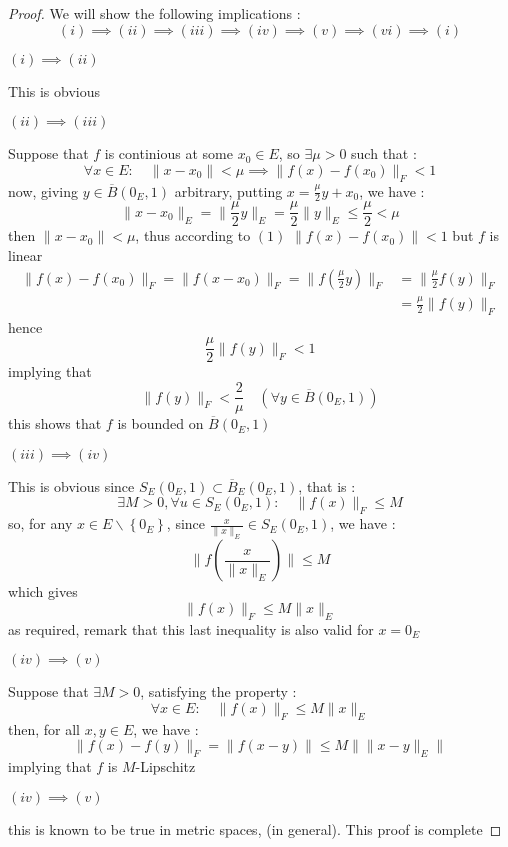 \begin{proof}
	We will show the following implications : 
	\[
		(i)  \implies 
		(ii)  \implies 
		(iii)  \implies 
		(iv)  \implies 
		(v)  \implies 
		(vi)  \implies 
		(i) 
	\]
	\divider 
	\begin{center}
		$(i) \implies (ii)  $ 
	\end{center}
	This is obvious 
	\divider 
	\begin{center}
		$(ii) \implies (iii)  $ 
	\end{center}
	Suppose that $f$ is continious 
	at some $x_0 \in E$, so $\exists \mu > 0$ such that : 
	\begin{equation}
		\forall x \in E : 
		\quad \| x-x_0 \|  < \mu \implies 
		\| f(x)  - f(x_0)  \|  _{F} < 1
	\end{equation}
	now, giving $y \in  \overline{B} \left( 0_{E},1 \right)$ arbitrary, 
	putting $x = \frac{\mu}{2}y + x_0$, we have : 
	\[
	\| x-x_0 \| _{E} = 
	\| \frac{\mu}{2}y \| _{E} = 
	\frac{\mu}{2} \| y \| _{E} \leq  \frac{\mu}{2} < \mu
	\]
	then $\| x-x_0 \| < \mu$, thus according to $(1)$ 
	$\| f(x) - f(x_0)  \| <  1$ but $f$ is linear 
	\begin{align*}
	\| f(x) - f(x_0)  \|_{F} = 
	\| f(x-x_0)  \| _{F} = 
	\| f \left( \frac{\mu}{2} y \right) \| _{F} &=
	 \| \frac{\mu}{2} f \left( y \right) \| _{F} \\
						    &= \frac{\mu}{2}
						    \| f \left( y \right) \| _{F}
	\end{align*}
	hence 
	\[
	\frac{\mu}{2} \| f(y)  \| _{F} < 1
	\]
	implying that 
	\[
	\| f(y)  \| _{F} < \frac{2}{\mu} \quad 
	\left( \forall  y \in \overline{B}\left( 0_{E},1 \right) \right)
	\]
	this shows that $f$ is bounded on $\overline{B}(0_{E},1) $ 
	\divider 
	\begin{center}
		$(iii) \implies (iv)  $ 
	\end{center}
	This is obvious since $S_{E} \left( 0_{E},1 \right) \subset 
	\overline{B}_{E} \left( 0_{E},1 \right)$, that is : 
	\[
	\exists M > 0, \forall u \in S_{E} \left( 0_{E},1 \right) : 
	\quad \| f(x)  \| _{F} \leq M
	\]
	so, for any $x \in  E \backslash \left\{ 0_{E} \right\}$, since
	$\frac{x}{\| x \|_{E} } \in S_{E} \left( 0_{E},1 \right)$, we have :
	\[
		\| f \left( \frac{x}{\| x \| _{E}} \right) \|  \leq 
		M 
	\]
	which gives 
	\[
	\| f(x)  \| _{F} \leq M \| x \| _{E}
	\]
	as required, remark that this last inequality is also valid for 
	$x= 0_{E}$ 
	\divider 
	\begin{center}
		$(iv) \implies (v)  $ 
	\end{center}
	Suppose that $\exists  M > 0$, satisfying the property : 
	\[
	\forall  x \in  E: \quad 
	\| f(x)  \| _{F} \leq M \| x \| _{E}
	\]
	then, for all $x,y  \in  E$, we have : 
	\[
	\| f(x) - f(y)  \| _{F} = \| f(x-y)  \|  \leq M \| \| x-y \|_{E} \| 
	\]
	implying that $f$ is $M$-Lipschitz
	\divider
	\begin{center}
		$(iv) \implies (v)  $ 
	\end{center}
	this is known to be true in metric spaces, (in general). This proof
	is complete
 \end{proof}
% 
